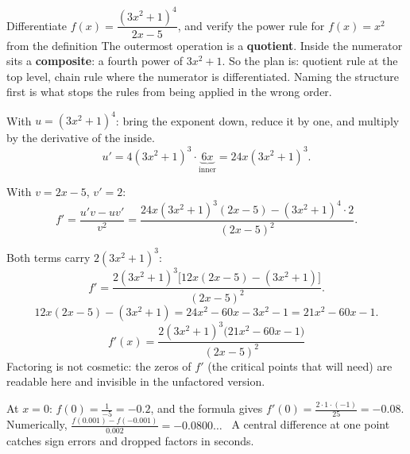 \begin{worked}{Differentiate $f(x)=\dfrac{(3x^{2}+1)^{4}}{2x-5}$, and verify the power rule for $f(x)=x^{2}$ from the definition}
The outermost operation is a \textbf{quotient}. Inside the numerator sits a
\textbf{composite}: a fourth power of $3x^{2}+1$. So the plan is: quotient
rule at the top level, chain rule where the numerator is differentiated.
Naming the structure first is what stops the rules from being applied in the
wrong order.

With $u=(3x^{2}+1)^{4}$: bring the exponent down, reduce it by one, and
multiply by the derivative of the inside.
\[
  u'=4(3x^{2}+1)^{3}\cdot\underbrace{6x}_{\text{inner}}=24x(3x^{2}+1)^{3} .
\]

With $v=2x-5$, $v'=2$:
\[
  f'=\frac{u'v-uv'}{v^{2}}
   =\frac{24x(3x^{2}+1)^{3}(2x-5)-(3x^{2}+1)^{4}\cdot2}{(2x-5)^{2}} .
\]

Both terms carry $2(3x^{2}+1)^{3}$:
\[
  f'=\frac{2(3x^{2}+1)^{3}\bigl[12x(2x-5)-(3x^{2}+1)\bigr]}{(2x-5)^{2}} .
\]
\[
  12x(2x-5)-(3x^{2}+1)=24x^{2}-60x-3x^{2}-1=21x^{2}-60x-1 .
\]
\[
  \boxed{f'(x)=\frac{2(3x^{2}+1)^{3}\bigl(21x^{2}-60x-1\bigr)}{(2x-5)^{2}}}
\]
Factoring is not cosmetic: the zeros of $f'$ (the critical points that
 will need) are readable here and invisible in the unfactored
version.

At $x=0$: $f(0)=\frac{1}{-5}=-0.2$, and the formula gives
$f'(0)=\frac{2\cdot1\cdot(-1)}{25}=-0.08$. Numerically,
$\frac{f(0.001)-f(-0.001)}{0.002}=-0.0800\ldots$ \checkmark\ A central
difference at one point catches sign errors and dropped factors in seconds.


\end{worked}
